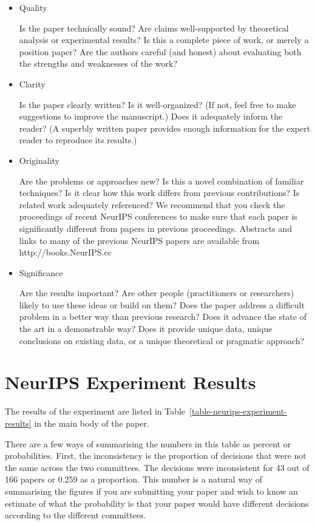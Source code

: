 \begin{itemize}
\item
  Quality

  Is the paper technically sound? Are claims well-supported by
  theoretical analysis or experimental results? Is this a complete piece
  of work, or merely a position paper? Are the authors careful (and
  honest) about evaluating both the strengths and weaknesses of the
  work?
\item
  Clarity

  Is the paper clearly written? Is it well-organized? (If not, feel free
  to make suggestions to improve the manuscript.) Does it adequately
  inform the reader? (A superbly written paper provides enough
  information for the expert reader to reproduce its results.)
\item
  Originality

  Are the problems or approaches new? Is this a novel combination of
  familiar techniques? Is it clear how this work differs from previous
  contributions? Is related work adequately referenced? We recommend
  that you check the proceedings of recent NeurIPS conferences to make sure
  that each paper is significantly different from papers in previous
  proceedings. Abstracts and links to many of the previous NeurIPS papers
  are available from http://books.NeurIPS.cc
\item
  Significance
  
  Are the results important? Are other people (practitioners or
  researchers) likely to use these ideas or build on them? Does the paper
  address a difficult problem in a better way than previous research? Does
  it advance the state of the art in a demonstrable way? Does it provide
  unique data, unique conclusions on existing data, or a unique
  theoretical or pragmatic approach?
\end{itemize}


\section{NeurIPS Experiment Results}
\label{app:neurips-experiment-results}

The results of the experiment are listed in Table~\ref{table-neurips-experiment-results} in the main body of the paper.

There are a few ways of summarising the numbers in this table as percent
or probabilities. First, the inconsistency is the proportion of decisions
that were not the same across the two committees. The decisions were
inconsistent for 43 out of 166 papers or 0.259 as a proportion. This
number is a natural way of summarising the figures if you are
submitting your paper and wish to know an estimate of what the
probability is that your paper would have different decisions according
to the different committees. 

